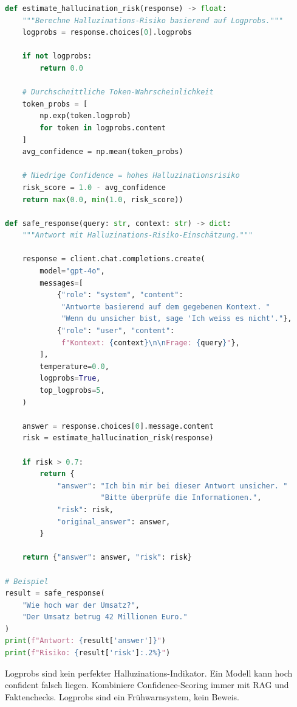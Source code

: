 \begin{lstlisting}[language=Python, caption=Confidence-Scoring mit Logprobs für Halluzinations-Erkennung]
def estimate_hallucination_risk(response) -> float:
    """Berechne Halluzinations-Risiko basierend auf Logprobs."""
    logprobs = response.choices[0].logprobs

    if not logprobs:
        return 0.0

    # Durchschnittliche Token-Wahrscheinlichkeit
    token_probs = [
        np.exp(token.logprob)
        for token in logprobs.content
    ]
    avg_confidence = np.mean(token_probs)

    # Niedrige Confidence = hohes Halluzinationsrisiko
    risk_score = 1.0 - avg_confidence
    return max(0.0, min(1.0, risk_score))

def safe_response(query: str, context: str) -> dict:
    """Antwort mit Halluzinations-Risiko-Einschätzung."""

    response = client.chat.completions.create(
        model="gpt-4o",
        messages=[
            {"role": "system", "content":
             "Antworte basierend auf dem gegebenen Kontext. "
             "Wenn du unsicher bist, sage 'Ich weiss es nicht'."},
            {"role": "user", "content":
             f"Kontext: {context}\n\nFrage: {query}"},
        ],
        temperature=0.0,
        logprobs=True,
        top_logprobs=5,
    )

    answer = response.choices[0].message.content
    risk = estimate_hallucination_risk(response)

    if risk > 0.7:
        return {
            "answer": "Ich bin mir bei dieser Antwort unsicher. "
                      "Bitte überprüfe die Informationen.",
            "risk": risk,
            "original_answer": answer,
        }

    return {"answer": answer, "risk": risk}

# Beispiel
result = safe_response(
    "Wie hoch war der Umsatz?",
    "Der Umsatz betrug 42 Millionen Euro."
)
print(f"Antwort: {result['answer']}")
print(f"Risiko: {result['risk']:.2%}")
\end{lstlisting}

\begin{praxishinweis}
Logprobs sind kein perfekter Halluzinations-Indikator. Ein Modell kann hoch confident falsch liegen. Kombiniere Confidence-Scoring immer mit RAG und Faktenchecks. Logprobs sind ein Frühwarnsystem, kein Beweis.
\end{praxishinweis}

